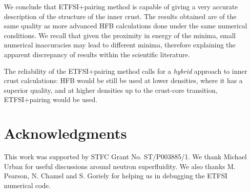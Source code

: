 \documentclass[
    amsmath,amssymb,
    aps,
    prc,
    floatfix,
]{revtex4-2}
\begin{document}
We conclude that ETFSI+pairing method is capable of giving a very accurate description of the structure of the inner crust. The results obtained are of the same quality as more advanced HFB calculations done under the same numerical conditions. We recall that given the proximity in energy of the minima, small numerical inaccuracies may lead to different minima, therefore explaining the apparent discrepancy of results within the scientific literature.

The reliability of the ETFSI+pairing method calls for a \emph{hybrid} approach to inner crust calculations: HFB would be still be used at lower densities, where it has a superior quality, and at higher densities up to the crust-core transition, ETFSI+pairing would be used.


\section*{Acknowledgments}

This work was supported by STFC Grant No. ST/P003885/1. We thank Michael Urban for useful discussions around neutron superfluidity. We also thanks M. Pearson, N. Chamel and S. Goriely for helping us in debugging the ETFSI numerical code.

\end{document}
